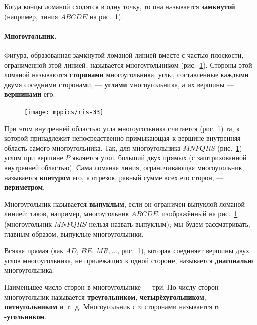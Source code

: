 Когда концы ломаной сходятся в одну точку, то она называется \textbf{замкнутой} (например, линия $ABCDE$ на рис.~\ref{1938/ris-33}).

\paragraph{Многоугольник.}\label{1938/34}
Фигура, образованная замкнутой ломаной линией вместе с частью плоскости, ограниченной этой линией, называется многоугольником (рис.~\ref{1938/ris-33}).
Стороны этой ломаной называются \textbf{сторонами} многоугольника, углы, составленные каждыми двумя соседними сторонами, — \textbf{углами} многоугольника, а их вершины — \textbf{вершинами} его.

\begin{figure}[h!]
\centering
\texttt{[image: mppics/ris-33]}
\caption{}\label{1938/ris-33}
\end{figure}

При этом внутренней областью угла многоугольника считается (рис. \ref{1938/ris-33}) та, к которой принадлежит непосредственно примыкающая к вершине внутренняя область самого многоугольника.
Так, для многоугольника $MNPQRS$ (рис.~\ref{1938/ris-33}) углом при вершине $P$ является угол, больший двух прямых (с заштрихованной внутренней областью).
Сама ломаная линия, ограничивающая многоугольник, называется \textbf{контуром} его, а отрезок, равный сумме всех его сторон, — \textbf{периметром}.

Многоугольник называется \textbf{выпуклым}, если он ограничен выпуклой ломаной линией;
таков, например, многоугольник $ABCDE$, изображённый на рис.~\ref{1938/ris-33} (многоугольник $MNPQRS$ нельзя назвать выпуклым);
мы будем рассматривать, главным образом, выпуклые многоугольники.

Всякая прямая (как $AD$, $BE$, $MR,\dots$, рис.~\ref{1938/ris-33}), которая соединяет вершины двух углов многоугольника, не прилежащих к одной стороне, называется \textbf{диагональю} многоугольника.

Наименьшее число сторон в многоугольнике — три.
По числу сторон многоугольник называется \textbf{треугольником}, \textbf{четырёхугольником}, \textbf{пятиугольником} и~т.~д. Многоугольник с $n$ сторонами называется \textbf{$\bm{n}$-угольником}. 

